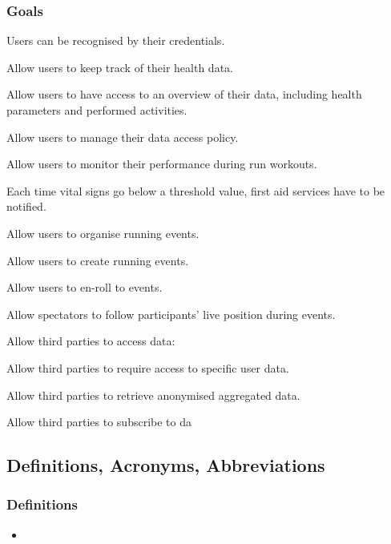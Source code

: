 \documentclass{article}
\begin{document}
\subsubsection{Goals} \label{goals}
\begin{enumerate}[label={\textbf{[G\arabic*]}}]
\item Users can be recognised by their credentials.
\item Allow users to keep track of their health data.
\item Allow users to have access to an overview of their data, including health parameters and performed activities. \label{g3}
\item Allow users to manage their data access policy.
\item Allow users to monitor their performance during run workouts.
\item Each time vital signs go below a threshold value, first aid services have to be notified.
\item Allow users to organise running events.
		\begin{enumerate}[label={[G\arabic{enumi}.\arabic*]}]
    		\item Allow users to create running events.
    		\item Allow users to en-roll to events.
    		\item Allow spectators to follow participants’ live position during events.
  		\end{enumerate}
\item Allow third parties to access data:
		\begin{enumerate}[label={[G\arabic{enumi}.\arabic*]}]
    		\item Allow third parties to require access to specific user data.
    		\item Allow third parties to retrieve anonymised aggregated data.
    		\item Allow third parties to subscribe to da
  		\end{enumerate}

\end{enumerate}

\subsection{Definitions, Acronyms, Abbreviations}

\subsubsection{Definitions}
\begin{itemize}
	\item 
\end{itemize}
\end{document}
